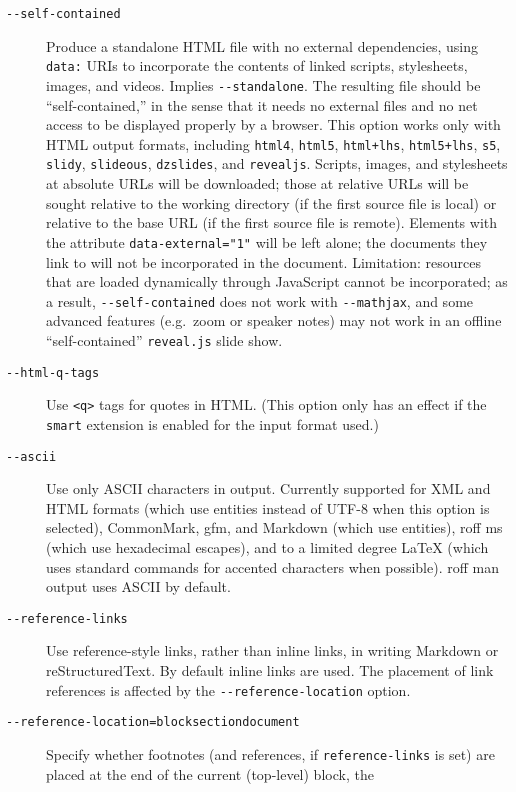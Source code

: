 \documentclass[]{article}
\begin{document}
\begin{description}
\item[\texttt{-\/-self-contained}]
Produce a standalone HTML file with no external dependencies, using
\texttt{data:} URIs to incorporate the contents of linked scripts,
stylesheets, images, and videos. Implies \texttt{-\/-standalone}. The
resulting file should be ``self-contained,'' in the sense that it needs
no external files and no net access to be displayed properly by a
browser. This option works only with HTML output formats, including
\texttt{html4}, \texttt{html5}, \texttt{html+lhs}, \texttt{html5+lhs},
\texttt{s5}, \texttt{slidy}, \texttt{slideous}, \texttt{dzslides}, and
\texttt{revealjs}. Scripts, images, and stylesheets at absolute URLs
will be downloaded; those at relative URLs will be sought relative to
the working directory (if the first source file is local) or relative to
the base URL (if the first source file is remote). Elements with the
attribute \texttt{data-external="1"} will be left alone; the documents
they link to will not be incorporated in the document. Limitation:
resources that are loaded dynamically through JavaScript cannot be
incorporated; as a result, \texttt{-\/-self-contained} does not work
with \texttt{-\/-mathjax}, and some advanced features (e.g.~zoom or
speaker notes) may not work in an offline ``self-contained''
\texttt{reveal.js} slide show.
\item[\texttt{-\/-html-q-tags}]
Use \texttt{\textless{}q\textgreater{}} tags for quotes in HTML. (This
option only has an effect if the \texttt{smart} extension is enabled for
the input format used.)
\item[\texttt{-\/-ascii}]
Use only ASCII characters in output. Currently supported for XML and
HTML formats (which use entities instead of UTF-8 when this option is
selected), CommonMark, gfm, and Markdown (which use entities), roff ms
(which use hexadecimal escapes), and to a limited degree LaTeX (which
uses standard commands for accented characters when possible). roff man
output uses ASCII by default.
\item[\texttt{-\/-reference-links}]
Use reference-style links, rather than inline links, in writing Markdown
or reStructuredText. By default inline links are used. The placement of
link references is affected by the \texttt{-\/-reference-location}
option.
\item[\texttt{-\/-reference-location=block}\textbar{}\texttt{section}\textbar{}\texttt{document}]
Specify whether footnotes (and references, if \texttt{reference-links}
is set) are placed at the end of the current (top-level) block, the

\end{description}
\end{document}
